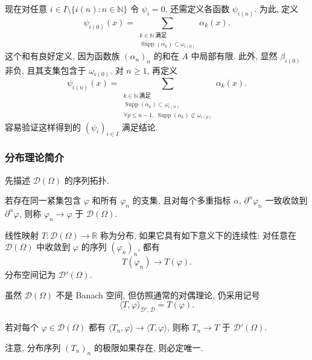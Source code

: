 \begin{Proof}
\begin{itemize}
现在对任意 $i\in I\setminus\{i(n):n\in\mathbb{N}\}$ 令 $\psi_i=0$. 还需定义各函数 $\psi_{i(n)}$. 为此, 定义
\[
  \psi_{i(0)}(x)
  =\sum_{\substack{k\in\mathbb{N}\,\text{满足}\\
  \operatorname{Supp}(\alpha_k)\subset\omega_{i(0)}}}\alpha_k(x).
\]
这个和有良好定义, 因为函数族 $(\alpha_n)_n$ 的和在 $A$ 中局部有限. 此外, 显然 $\beta_{i(0)}$ 非负, 且其支集包含于 $\omega_{i(0)}$. 对 $n\geq1$, 再定义
\[
  \psi_{i(n)}(x)
  =\sum_{\substack{k\in\mathbb{N}\,\text{满足}\\
  \operatorname{Supp}(\alpha_k)\subset\omega_{i(n)}\\
  \forall p\leq n-1,\ \operatorname{Supp}(\alpha_k)\not\subset\omega_{i(p)}}}
  \alpha_k(x).
\]
容易验证这样得到的 $(\psi_i)_{i\in I}$ 满足结论.
\end{itemize}
\end{Proof}

\subsubsection{分布理论简介}
\label{subsec:chap2-distributions}

先描述 $\mathcal{D}(\Omega)$ 的序列拓扑.

若存在同一紧集包含 $\varphi$ 和所有 $\varphi_n$ 的支集, 且对每个多重指标 $\alpha$, $\partial^\alpha\varphi_n$ 一致收敛到 $\partial^\alpha\varphi$, 则称 $\varphi_n\to\varphi$ 于 $\mathcal{D}(\Omega)$.

\begin{Definition}[Distributions]
\label{def:chap2-distribution}
线性映射 $T:\mathcal{D}(\Omega)\to\mathbb{R}$ 称为分布, 如果它具有如下意义下的连续性: 对任意在 $\mathcal{D}(\Omega)$ 中收敛到 $\varphi$ 的序列 $(\varphi_n)_n$, 都有
\[
  T(\varphi_n)\longrightarrow T(\varphi).
\]
分布空间记为 $\mathcal{D}'(\Omega)$.
\end{Definition}

虽然 $\mathcal{D}(\Omega)$ 不是 Banach 空间, 但仿照通常的对偶理论, 仍采用记号
\[
  \langle T,\varphi\rangle_{\mathcal{D}',\mathcal{D}}=T(\varphi).
\]

\begin{Definition}
\label{def:chap2-distribution-convergence}
若对每个 $\varphi\in\mathcal{D}(\Omega)$ 都有 $\langle T_n,\varphi\rangle\to\langle T,\varphi\rangle$, 则称 $T_n\to T$ 于 $\mathcal{D}'(\Omega)$.
\end{Definition}

注意, 分布序列 $(T_n)_n$ 的极限如果存在, 则必定唯一.

